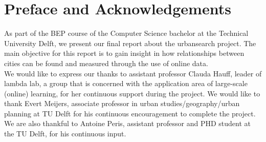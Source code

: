 \chapter*{Preface and Acknowledgements}
As part of the BEP course of the Computer Science bachelor at the Technical University Delft, we present our final report about the urbansearch project. The main objective for this report is to gain insight in how relationships between cities can be found and measured through the use of online data.\\

We would like to express our thanks to assistant professor Clauda Hauff, leader of lambda lab, a group that is concerned with the application area of large-scale (online) learning, for her continuous support during the project. We would like to thank Evert Meijers, associate professor in urban studies/geography/urban planning at TU Delft for his continuous encouragement to complete the project. We are also thankful to Antoine Peris, assistant professor and PHD student at the TU Delft, for his continuous input.